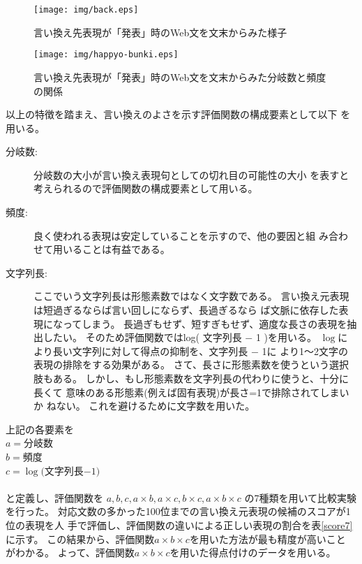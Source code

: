 \documentclass[jnlpbbl]{jnlp_j}
\begin{document}
\begin{figure}[htb]
\begin{center}
\texttt{[image: img/back.eps]}
\caption{言い換え先表現が「発表」時のWeb文を文末からみた様子}
\label{rev-bunki}
\end{center}
\end{figure}

\begin{figure}[htb]
\begin{center}
\texttt{[image: img/happyo-bunki.eps]}
\caption{言い換え先表現が「発表」時のWeb文を文末からみた分岐数と頻度の関係}
\label{happyo-bunki}
\end{center}
\end{figure}

以上の特徴を踏まえ、言い換えのよさを示す評価関数の構成要素として以下
を用いる。

\begin{description}
\item[分岐数:] 分岐数の大小が言い換え表現句としての切れ目の可能性の大小
	   を表すと考えられるので評価関数の構成要素として用いる。
\item[頻度:] 良く使われる表現は安定していることを示すので、他の要因と組
	   み合わせて用いることは有益である。
\item[文字列長:] ここでいう文字列長は形態素数ではなく文字数である。
	   言い換え元表現は短過ぎるならば言い回しにならず、長過ぎるなら
	   ば文脈に依存した表現になってしまう。
	   長過ぎもせず、短すぎもせず、適度な長さの表現を抽出したい。
	   そのため評価関数ではlog( 文字列長 $-$ 1 )を用いる。
	   $\log$により長い文字列に対して得点の抑制を、文字列長 $-$ 1に
	   より1〜2文字の表現の排除をする効果がある。
	   さて、長さに形態素数を使うという選択肢もある。
	   しかし、もし形態素数を文字列長の代わりに使うと、十分に長くて
	   意味のある形態素(例えば固有表現)が長さ=1で排除されてしまいか
	   ねない。
	   これを避けるために文字数を用いた。
\end{description} 

\noindent
上記の各要素を\\
$a = $分岐数\\
$b = $頻度\\
$c = \log($文字列長$ - 1)$
\\\\
と定義し、評価関数を
$a, b, c, a \times b, a \times c, b\times c, a\times b\times c$
の7種類を用いて比較実験を行った。
対応文数の多かった100位までの言い換え元表現の候補のスコアが1位の表現を人
手で評価し、評価関数の違いによる正しい表現の割合を表\ref{score7}に示す。
この結果から、評価関数$a \times b \times c$を用いた方法が最も精度が高いこと
がわかる。
よって、評価関数$a \times b \times c$を用いた得点付けのデータを用いる。
\end{document}
